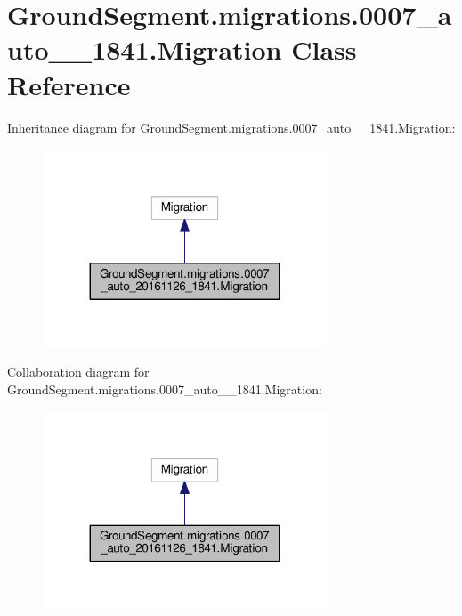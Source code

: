 \hypertarget{class_ground_segment_1_1migrations_1_10007__auto__20161126__1841_1_1_migration}{}\section{Ground\+Segment.\+migrations.0007\+\_\+auto\+\_\+\_\+1841.Migration Class Reference}
\label{class_ground_segment_1_1migrations_1_10007__auto__20161126__1841_1_1_migration}


Inheritance diagram for Ground\+Segment.\+migrations.0007\+\_\+auto\+\_\+\_\+1841.Migration\+:\nopagebreak
\begin{figure}[H]
\begin{center}
\leavevmode
\includegraphics[width=239pt]{class_ground_segment_1_1migrations_1_10007__auto__20161126__1841_1_1_migration__inherit__graph}
\end{center}
\end{figure}


Collaboration diagram for Ground\+Segment.\+migrations.0007\+\_\+auto\+\_\+\_\+1841.Migration\+:\nopagebreak
\begin{figure}[H]
\begin{center}
\leavevmode
\includegraphics[width=239pt]{class_ground_segment_1_1migrations_1_10007__auto__20161126__1841_1_1_migration__coll__graph}
\end{center}
\end{figure}
